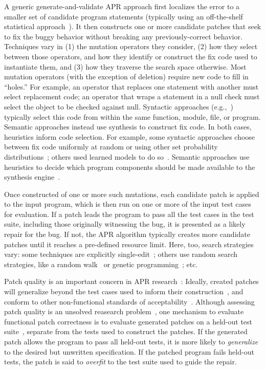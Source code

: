 \documentclass[conference]{IEEEtran}
\begin{document}
A generic generate-and-validate APR approach first
localizes the error to a smaller set of
candidate program statements (typically using an off-the-shelf statistical approach~\cite{Jones02}).  It
then constructs one or more candidate patches that seek to fix the buggy
behavior without breaking any previously-correct behavior.  
Techniques vary in (1) the mutation operators they consider, (2) how they select
between those operators, and how they identify or
construct the fix code used to instantiate them, and (3) how they traverse
the search space otherwise.  
Most mutation operators (with the exception of deletion) require new code to
fill in ``holes.''  For example, an operator that replaces one statement with
another must select replacement code; an operator that wraps a statement
in a null check must select the object to be checked against null.
Syntactic approaches (e.g.,~\cite{legoues12Genprog,long16proph,kim2013,xuan16}) typically select this code from within the
same function, module, file, or program.  Semantic approaches instead use synthesis to
construct fix code.  
In both cases, heuristics inform code selection.  For example, some syntactic approaches
choose between fix code uniformly at random or using other set probability distributions~\cite{examples}; others used learned
models to do so~\cite{long16proph}.  Semantic approaches use heuristics to
decide which program components should be made available to the synthesis
engine~\cite{Mechtaev2016,xuanNopol}. 

Once constructed of one or more such mutations, each candidate patch is
applied to the input program, which is then run on
one or more of the input test cases for evaluation.  If a patch leads the
program to 
pass all the test cases in the test suite, including those originally witnessing
the bug, it is presented as a likely repair for the bug. 
If not, the APR algorithm typically creates more candidate patches 
until it reaches a pre-defined resource limit. 
Here, too, search strategies vary: some techniques 
are explicitly single-edit~\cite{Qi13TrpAutoR,Weimer13,nopol}; others use
random search strategies, like a random walk~\cite{debroy10} or genetic
programming~\cite{kim2013,legoues12,xuan16}; etc. 

Patch quality is an important concern in APR research~\cite{Qi15}: Ideally,
created patches will generalize beyond the test cases used to inform their
construction~\cite{smith15}, and conform to other non-functional standards of
acceptability~\cite{fry2010,kim2013}.  Although assessing patch quality is an
unsolved reasearch problem~\cite{monperrus14critical}, one mechanism to evaluate functional patch
correctness is to evaluate generated patches on a held-out test suite~\cite{smith15,legoues12Genprog}, separate
from the tests used to construct the patches. 
If the generated patch allows the program to pass all held-out tests, it is more likely to
\emph{generalize} to the desired but unwritten specification. If the patched
program fails held-out tests, the patch is said to \emph{overfit} to 
the test suite used to guide the repair. 
\end{document}
